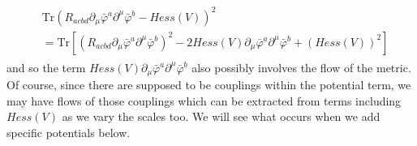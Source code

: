 \begin{align}
    \begin{split}
        &\text{Tr} (R_{acbd} \partial _{\mu} \bar \varphi^{a} \partial ^{\mu} \bar \varphi ^{b} - Hess (V)) ^{2} \\
        & = \text{Tr} [(R_{acbd}\partial _{\mu} \bar \varphi^{a} \partial ^{\mu} \bar \varphi ^{b}) ^{2} - 2Hess(V) \partial _{\mu} \bar \varphi^{a} \partial ^{\mu} \bar \varphi ^{b} + (Hess(V))^{2}]
    \end{split}
\end{align}
and so the term $Hess(V) \partial _{\mu} \bar \varphi^{a} \partial ^{\mu} \bar \varphi ^{b}$ also possibly involves the flow of the metric. Of course, since there are supposed to be couplings within the potential term, we may have flows of those couplings which can be extracted from terms including $Hess(V)$ as we vary the scales too. We will see what occurs when we add specific potentials below.


